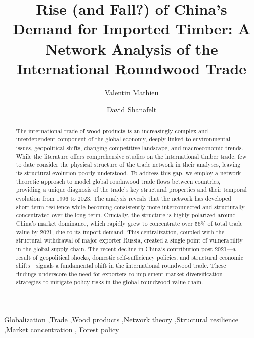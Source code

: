 \documentclass[
  authoryear,
  review,
  3p]{elsarticle}
\begin{document}
\begin{frontmatter}
\title{Rise (and Fall?) of China's Demand for Imported Timber: A Network
Analysis of the International Roundwood Trade}
\author[1,2]{Valentin Mathieu%
%
}
\author[2]{David Shanafelt%
%
}




        
\begin{abstract}
The international trade of wood products is an increasingly complex and
interdependent component of the global economy, deeply linked to
environmental issues, geopolitical shifts, changing competitive
landscape, and macroeconomic trends. While the literature offers
comprehensive studies on the international timber trade, few to date
consider the physical structure of the trade network in their analyses,
leaving its structural evolution poorly understood. To address this gap,
we employ a network-theoretic approach to model global roudnwood trade
flows between countries, providing a unique diagnosis of the trade's key
structural properties and their temporal evolution from 1996 to 2023.
The analysis reveals that the network has developed short-term
resilience while becoming consistently more interconnected and
structurally concentrated over the long term. Crucially, the structure
is highly polarized around China's market dominance, which rapidly grew
to concentrate over 56\% of total trade value by 2021, due to its import
demand. This centralization, coupled with the structural withdrawal of
major exporter Russia, created a single point of vulnerability in the
global supply chain. The recent decline in China's contribution
post-2021---a result of geopolitical shocks, domestic self-sufficiency
policies, and structural economic shifts---signals a fundamental shift
in the international roundwood trade. These findings underscore the need
for exporters to implement market diversification strategies to mitigate
policy risks in the global roundwood value chain.
\end{abstract}





\begin{keyword}
    Globalization \sep Trade \sep Wood products \sep Network
theory \sep Structural resilience \sep Market concentration \sep 
    Forest policy
\end{keyword}
\end{frontmatter}
    
\end{document}
